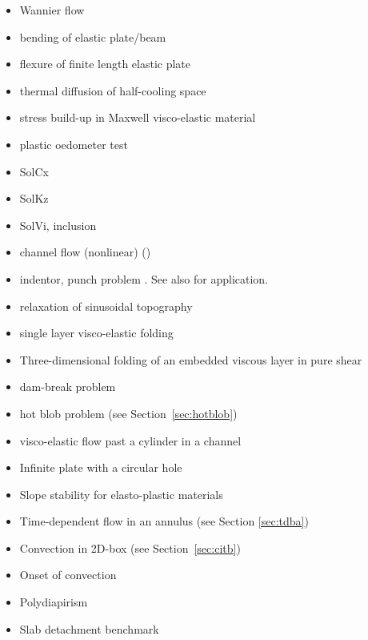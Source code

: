 \begin{itemize}
\item Wannier flow \cite{wann50,yemu99,cehg14}
\item bending of elastic plate/beam \cite{cehg14,boht08a,vosc15,egat10,demh19}
\item flexure of finite length elastic plate \cite{chtl13}
\item thermal diffusion of half-cooling space \cite{chtl13}
\item stress build-up in Maxwell visco-elastic material \cite{geyu07,chtl13,egat10,demh19}
\item plastic oedometer test  \cite{chtl13}
\item SolCx \cite{mamo08,demh19,aspectmanual}
\item SolKz \cite{mamo08,demh19,aspectmanual}
\item SolVi, inclusion \cite{kapo06,maie12,deka08,bepo10,vosc15,demh19,aspectmanual}
\item channel flow (nonlinear) \cite{maie12,frbt19,gery10,egat10} (\bscthesis) 
\item indentor, punch problem \cite{engl82,thfb08,mota77,gepd98,gltf18}. 
      See also \cite{hukm03,fojd04,gerb12} for application.
\item relaxation of sinusoidal topography \cite{crsg12,robh17}
\item single layer visco-elastic folding \cite{vosc15}
\item Three-dimensional folding of an embedded viscous layer in pure shear \cite{flet91}
\item dam-break problem \cite{moeb99,bacp07,liir07,lemx08,homa09,anco09,grdn97,hini81,basd08}
\item hot blob problem \cite{bugs09,fumt11} (see Section~\ref{sec:hotblob})
\item visco-elastic flow past a cylinder in a channel \cite{bepo10}
\item Infinite plate with a circular hole \cite{rama16}
\item Slope stability for elasto-plastic materials \cite{rama16}
\item Time-dependent flow in an annulus \cite{galb19} (see Section \ref{sec:tdba})
\item Convection in 2D-box \cite{galb19} (see Section~\ref{sec:citb})
\item Onset of convection \cite{aspectmanual}
\item Polydiapirism \cite{wesc92,aspectmanual}
\item Slab detachment benchmark \cite{schm11,aspectmanual,gltf18}

\end{itemize}
